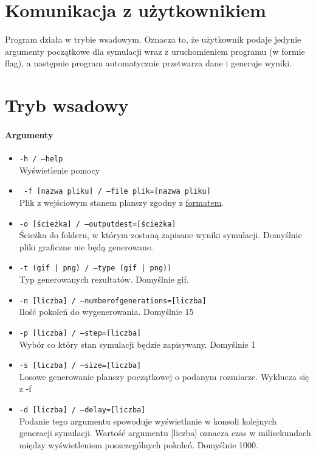 \documentclass{report}
\begin{document}
\section{Komunikacja z użytkownikiem}
Program działa w trybie wsadowym. Oznacza to, że użytkownik podaje jedynie argumenty początkowe dla symulacji wraz z uruchomieniem programu (w formie flag), a następnie program automatycznie przetwarza dane i generuje wyniki.

\section{Tryb wsadowy}
\paragraph{Argumenty}
\begin{itemize}
\item \texttt{-h / --help} \\ Wyświetlenie pomocy
\item \texttt{ -f [nazwa pliku]  / --file plik=[nazwa pliku] } 
	\\ Plik z wejściowym stanem planszy zgodny z \hyperref[format]{\textcolor{LinkColor}{formatem}}.
\item \texttt{-o [ścieżka] / --output\textunderscore{}dest=[ścieżka]}  \\Ścieżka do folderu, w którym zostaną zapisane wyniki \label{output_dest} symulacji. Domyślnie pliki graficzne nie będą generowane.
\item \texttt{-t (gif | png) / --type (gif | png))} \\Typ generowanych rezultatów. Domyślnie gif. \label{output_args}
\item \texttt{-n [liczba] / --number\textunderscore{}of\textunderscore{}generations=[liczba]} \\ Ilość pokoleń do wygenerowania. Domyślnie 15
\item \texttt{-p [liczba] / --step=[liczba]} \\ Wybór co który stan symulacji będzie zapisywany. Domyślnie 1
\item \texttt{-s [liczba] / --size=[liczba]} \\ Losowe generowanie planszy początkowej o podanym rozmiarze. Wyklucza się z -f
\item \label{delay} \texttt{-d [liczba] / --delay=[liczba]} \\ Podanie tego argumentu spowoduje wyświetlanie w konsoli kolejnych generacji symulacji. Wartość argumentu [liczba] oznacza czas  w milisekundach między wyświetleniem poszczególnych pokoleń. Domyślnie 1000.
\end{itemize}
\end{document}
